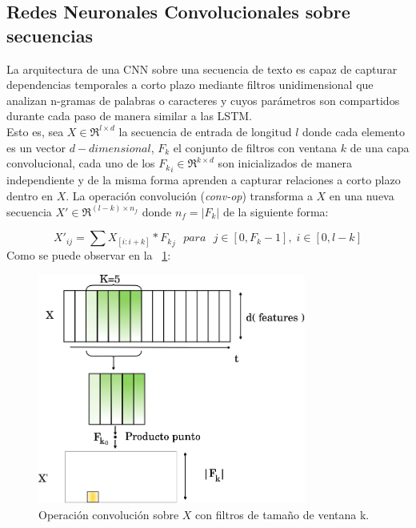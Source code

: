 \subsection{Redes Neuronales Convolucionales sobre secuencias}
	
	La arquitectura de una CNN \citep{lecun1998gradient} sobre una secuencia de texto es capaz de capturar dependencias temporales a corto plazo mediante filtros unidimensional que analizan n-gramas de palabras o caracteres y cuyos parámetros son compartidos durante cada paso de manera similar a las LSTM.
	\\
	Esto es, sea $X \in \Re^{l\times d}$ la secuencia de entrada de longitud $l$ donde cada elemento es un vector $d-dimensional$, $F_k$ el conjunto de filtros con ventana $k$ de una capa convolucional, cada uno de los ${F_k}_i \in \Re^{k\times d}$ son inicializados de manera independiente y de la misma forma aprenden a capturar relaciones a corto plazo  dentro en $X$. La operación convolución (\textit{conv-op}) transforma a $X$ en una nueva secuencia $X' \in \Re^{(l - k) \times n_f}$ donde $n_f = |F_k|$ de la siguiente forma:
	
	\begin{equation}
		X'_{ij} = \sum X_{[i:i+k]} * {F_k}_j ~~~ para ~~~ j \in [0, F_k-1], \;i \in [0, l-k]
	\end{equation}
	Como se puede observar en la \figurename~\ref{cnn}:

	\begin{figure}[!thb]
		\begin{center}
			\includegraphics[width=250pt]{images/cnn.eps}
		\end{center}
		\caption[Operación Convolución. CNN]{Operación convolución sobre $X$ con filtros de tamaño de ventana k. }
		\label{cnn}
	\end{figure}

